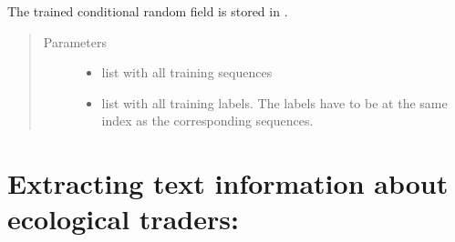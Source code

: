 \documentclass[letterpaper,10pt,english]{sphinxmanual}
\begin{document}
\begin{fulllineitems}
\begin{fulllineitems}
The trained conditional random field is stored in
.
\begin{quote}\begin{description}
\item[{Parameters}] \leavevmode\begin{itemize}
\item {} 
 \textendash{} list with all training sequences

\item {} 
 \textendash{} list with all training labels. The labels have to be
at the same index as the corresponding sequences.

\end{itemize}

\end{description}\end{quote}

\end{fulllineitems}


\end{fulllineitems}



\section{Extracting text information about ecological traders:}
\label{\detokenize{api:module-oeko}}\label{\detokenize{api:extracting-text-information-about-ecological-traders}}
\end{document}
